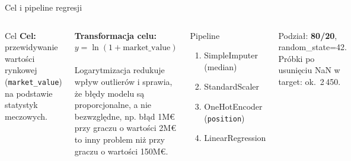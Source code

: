 \documentclass[aspectratio=169]{beamer}
\begin{document}
\begin{frame}[fragile]{Cel i pipeline regresji}
    \begin{columns}[T]
            \begin{block}{Cel}
                \textbf{Cel:} przewidywanie wartości rynkowej (\texttt{market\_value}) na podstawie statystyk meczowych.
            \end{block}
    
            \vspace{0.5cm}
            
            \textbf{Transformacja celu:} $y = \ln(1 + \text{market\_value})$ \\ \\
            Logarytmizacja redukuje wpływ outlierów i sprawia, że błędy modelu są proporcjonalne, a nie bezwzględne, np. błąd 1M€ przy graczu o wartości 2M€ to inny problem niż przy graczu o wartości 150M€.

            \begin{block}{Pipeline}
                \begin{enumerate}
                    \item SimpleImputer (median)
                    \item StandardScaler
                    \item OneHotEncoder (\texttt{position})
                    \item LinearRegression
                \end{enumerate}
            \end{block}
            
            \vspace{0.5cm}
            
            Podział: \textbf{80/20}, random\_state=42.\\
            Próbki po usunięciu NaN w target: ok.~2\,450.

    \end{columns}
\end{frame}
\end{document}
